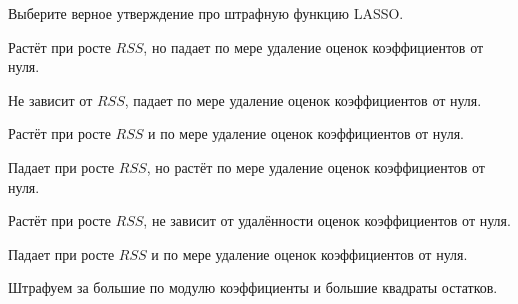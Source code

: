 
\begin{question}
Выберите верное утверждение про штрафную функцию LASSO.
\begin{answerlist}
  \item Растёт при росте \(RSS\), но падает по мере удаление оценок коэффициентов от нуля.
  \item Не зависит от \(RSS\), падает по мере удаление оценок коэффициентов от нуля.
  \item Растёт при росте \(RSS\) и по мере удаление оценок коэффициентов от нуля.
  \item Падает при росте \(RSS\), но растёт по мере удаление оценок коэффициентов от нуля.
  \item Растёт при росте \(RSS\), не зависит от удалённости оценок коэффициентов от нуля.
  \item Падает при росте \(RSS\) и по мере удаление оценок коэффициентов от нуля.
\end{answerlist}
\end{question}

\begin{solution}
Штрафуем за большие по модулю коэффициенты и большие квадраты остатков.
\end{solution}

